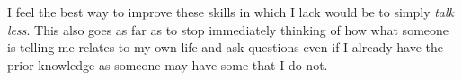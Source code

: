 \documentclass[stu,12pt]{apa7}
\begin{document}
      I feel the best way to improve these skills in which I lack would be to
        simply \emph{talk less}. This also goes as far as to stop immediately
        thinking of how what someone is telling me relates to my own life and
        ask questions even if I already have the prior knowledge as someone may
        have some that I do not.


  
  
\end{document}
